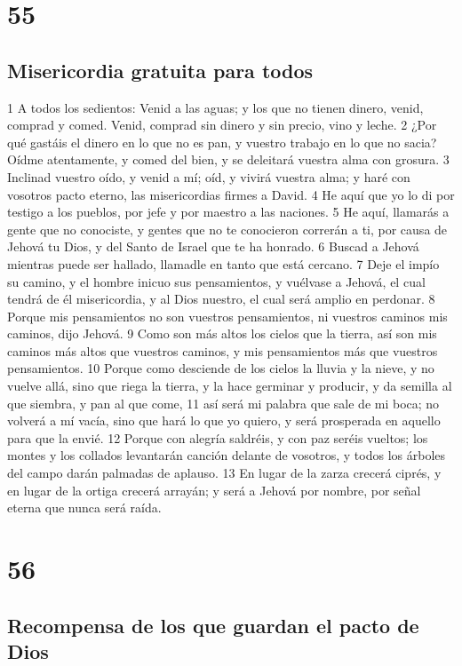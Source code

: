 \chapter{55}

\section*{Misericordia gratuita para todos}

1 A todos los sedientos: Venid a las aguas; y los que no tienen dinero, venid, comprad y comed. Venid, comprad sin dinero y sin precio, vino y leche.
2 ¿Por qué gastáis el dinero en lo que no es pan, y vuestro trabajo en lo que no sacia? Oídme atentamente, y comed del bien, y se deleitará vuestra alma con grosura.
3 Inclinad vuestro oído, y venid a mí; oíd, y vivirá vuestra alma; y haré con vosotros pacto eterno, las misericordias firmes a David. 
4 He aquí que yo lo di por testigo a los pueblos, por jefe y por maestro a las naciones.
5 He aquí, llamarás a gente que no conociste, y gentes que no te conocieron correrán a ti, por causa de Jehová tu Dios, y del Santo de Israel que te ha honrado.
6 Buscad a Jehová mientras puede ser hallado, llamadle en tanto que está cercano.
7 Deje el impío su camino, y el hombre inicuo sus pensamientos, y vuélvase a Jehová, el cual tendrá de él misericordia, y al Dios nuestro, el cual será amplio en perdonar.
8 Porque mis pensamientos no son vuestros pensamientos, ni vuestros caminos mis caminos, dijo Jehová.
9 Como son más altos los cielos que la tierra, así son mis caminos más altos que vuestros caminos, y mis pensamientos más que vuestros pensamientos.
10 Porque como desciende de los cielos la lluvia y la nieve, y no vuelve allá, sino que riega la tierra, y la hace germinar y producir, y da semilla al que siembra, y pan al que come,
11 así será mi palabra que sale de mi boca; no volverá a mí vacía, sino que hará lo que yo quiero, y será prosperada en aquello para que la envié.
12 Porque con alegría saldréis, y con paz seréis vueltos; los montes y los collados levantarán canción delante de vosotros, y todos los árboles del campo darán palmadas de aplauso.
13 En lugar de la zarza crecerá ciprés, y en lugar de la ortiga crecerá arrayán; y será a Jehová por nombre, por señal eterna que nunca será raída.

\chapter{56}

\section*{Recompensa de los que guardan el pacto de Dios}

